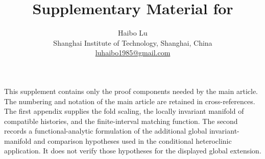 \documentclass[11pt]{article}
\title{Supplementary Material for\\[2mm]\papertitle}
\author{Haibo Lu\\
  \small Shanghai Institute of Technology, Shanghai, China\\
  \small \href{mailto:luhaibo1985@gmail.com}{luhaibo1985@gmail.com}}
\date{}
\begin{document}
\maketitle

This supplement contains only the proof components needed by the main
article.  The numbering and notation of the main article are retained in
cross-references.  The first appendix supplies the fold scaling, the locally
invariant manifold of compatible histories, and the finite-interval matching function.  The
second records a functional-analytic formulation of the additional global
invariant-manifold and comparison hypotheses used in the conditional
heteroclinic application.  It does not verify those hypotheses for the
displayed global extension.

\appendix


\end{document}
